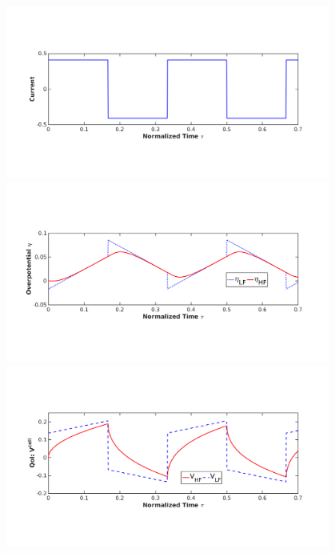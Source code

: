 \documentclass[10pt,xcolor=dvipsnames,compress]{beamer}
\begin{document}
\begin{frame}
\begin{columns}
\begin{column}{.52\textwidth}
\end{column}
\begin{column}{.50\textwidth}
\begin{center}
\begin{figure}[h]
    \centering
    \includegraphics[trim = 1.2in 2.4in 1.6in 2.8in, clip, width=1\textwidth]{figs/I.png}
    \\
    \includegraphics[trim = 1.2in 2.4in 1.6in 2.8in, clip, width=1\textwidth]{figs/etaLF_HF.png}   
    \\
    \includegraphics[trim = 1.2in 2.4in 1.6in 2.8in, clip, width=1\textwidth]{figs/Vcell_HF_LF.png} 
\end{figure}
\end{center}
\end{column}
\end{columns}


\vfill
\end{frame}
\end{document}
